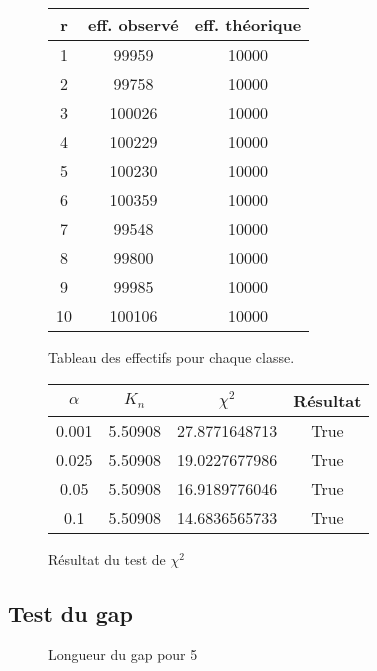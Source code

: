 \documentclass[a4paper,10pt]{article}
\begin{document}
\begin{figure}[h!]
\begin{center}
\begin{tabular}{|c|c|c|}
\hline
r & eff. observé & eff. théorique \\
\hline
1 & 99959 & 10000\\
2 & 99758 & 10000\\
3 & 100026 & 10000\\
4 & 100229 & 10000\\
5 & 100230 & 10000\\
6 & 100359 & 10000\\
7 & 99548 & 10000\\
8 & 99800 & 10000\\
9 & 99985 & 10000\\
10 & 100106 & 10000\\
\hline
\end{tabular}
\end{center}
\caption{Tableau des effectifs pour chaque classe.}
\end{figure}

\begin{figure}[h!]
\begin{center}
\begin{tabular}{|c|c|c|c|}
\hline
$\alpha$ & $K_n$ & $\chi^2$ & Résultat\\
\hline
0.001 & 5.50908 & 27.8771648713 & True\\
0.025 & 5.50908 & 19.0227677986 & True\\
0.05 & 5.50908 & 16.9189776046 & True\\
0.1 & 5.50908 & 14.6836565733 & True\\
\hline
\end{tabular}
\end{center}
\caption{Résultat du test de $\chi^2$}
\end{figure}

\subsection{Test du gap}

\begin{figure}[h!]
\caption{Longueur du gap pour 5}
\label{khi2histo}
\end{figure}

\end{document}
